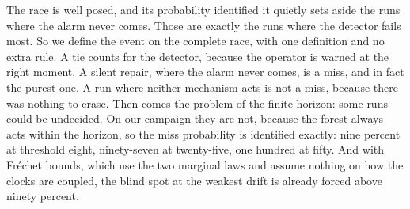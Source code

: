 \documentclass[aspectratio=169,11pt]{beamer}
\begin{document}
\begin{frame}{The race is well posed, and its probability identified}
{    it quietly sets aside the runs where the alarm never comes. Those are exactly the runs
    where the detector fails most. So we define the event on the complete race, with one
    definition and no extra rule. A tie counts for the detector, because the operator is
    warned at the right moment. A silent repair, where the alarm never comes, is a miss, and
    in fact the purest one. A run where neither mechanism acts is not a miss, because there
    was nothing to erase. Then comes the problem of the finite horizon: some runs could be
    undecided. On our campaign they are not, because the forest always acts within the
    horizon, so the miss probability is identified exactly: nine percent at threshold eight,
    ninety-seven at twenty-five, one hundred at fifty. And with Fréchet bounds, which use the
    two marginal laws and assume nothing on how the clocks are coupled, the blind spot at the
    weakest drift is already forced above ninety percent.}
\end{frame}
\end{document}
